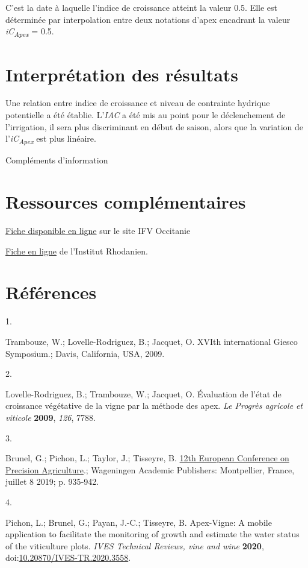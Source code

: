 \documentclass[
  a4paperpaper,
  DIV=11,
  numbers=noendperiod]{scrartcl}
\newlength{\cslhangindent}
\newlength{\csllabelwidth}
\newenvironment{CSLReferences}[2] %
 {\begin{list}{}{%
  \setlength{\itemindent}{0pt}
  \setlength{\leftmargin}{0pt}
  \setlength{\parsep}{0pt}
  \ifodd #1
   \setlength{\leftmargin}{\cslhangindent}
   \setlength{\itemindent}{-1\cslhangindent}
  \fi
  \setlength{\itemsep}{#2\baselineskip}}}
 {\end{list}}
\newcommand{\CSLLeftMargin}[1]{\parbox[t]{\csllabelwidth}{\strut#1\strut}}
\newcommand{\CSLRightInline}[1]{\parbox[t]{\linewidth - \csllabelwidth}{\strut#1\strut}}
\begin{document}
C'est la date à laquelle l'indice de croissance atteint la valeur 0.5.
Elle est déterminée par interpolation entre deux notations d'apex
encadrant la valeur \emph{iC\textsubscript{Apex}} = 0.5.

\section{Interprétation des
résultats}\label{interpruxe9tation-des-ruxe9sultats}

Une relation entre indice de croissance et niveau de contrainte hydrique
potentielle a été établie. L'\emph{IAC} a été mis au point pour le
déclenchement de l'irrigation, il sera plus discriminant en début de
saison, alors que la variation de l'\emph{iC\textsubscript{Apex}} est
plus linéaire.

Compléments d'information

\section{Ressources
complémentaires}\label{ressources-compluxe9mentaires}

\href{https://www.vignevin-occitanie.com/fiches-pratiques/methode-des-apex/}{Fiche
disponible en ligne} sur le site IFV Occitanie

\href{https://www.institut-rhodanien.com/article/fiche-technique-la-methode-des-apex}{Fiche
en ligne} de l'Institut Rhodanien.

\section*{Références}\label{ruxe9fuxe9rences}

\label{refs}
\begin{CSLReferences}{0}{0}
\CSLLeftMargin{1. }%
\CSLRightInline{Trambouze, W.; Lovelle-Rodriguez, B.; Jacquet, O. XVIth
international Giesco Symposium.; Davis, California, USA, 2009.}

\CSLLeftMargin{2. }%
\CSLRightInline{Lovelle-Rodriguez, B.; Trambouze, W.; Jacquet, O.
Évaluation de l'état de croissance végétative de la vigne par la méthode
des apex. \emph{Le Progrès agricole et viticole} \textbf{2009},
\emph{126}, 7788.}

\CSLLeftMargin{3. }%
\CSLRightInline{Brunel, G.; Pichon, L.; Taylor, J.; Tisseyre, B.
\href{https://doi.org/10.3920/978-90-8686-888-9_115}{12th European
Conference on Precision Agriculture}.; Wageningen Academic Publishers:
Montpellier, France, juillet 8 2019; p. 935‑942.}

\CSLLeftMargin{4. }%
\CSLRightInline{Pichon, L.; Brunel, G.; Payan, J.-C.; Tisseyre, B.
Apex-Vigne: A mobile application to facilitate the monitoring of growth
and estimate the water status of the viticulture plots. \emph{IVES
Technical Reviews, vine and wine} \textbf{2020},
doi:\href{https://doi.org/10.20870/IVES-TR.2020.3558}{10.20870/IVES-TR.2020.3558}.}

\end{CSLReferences}
\end{document}
